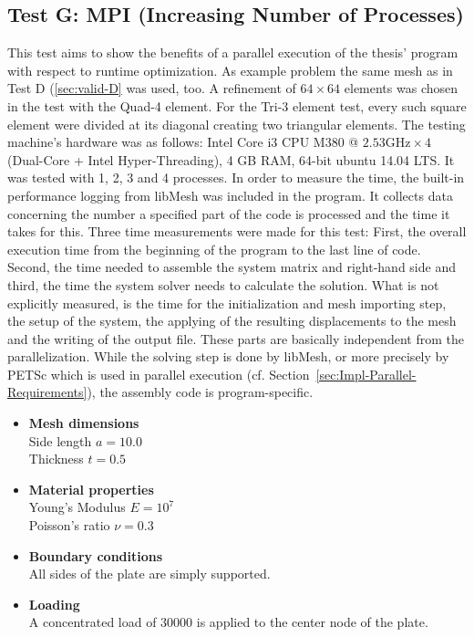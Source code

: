  \subsection{Test G: MPI (Increasing Number of Processes)}\label{sec:valid-G}
  This test aims to show the benefits of a parallel execution of the thesis' program with respect to runtime optimization. As example problem the same mesh as in Test D (\ref{sec:valid-D} was used, too. A refinement of $64\!\times\!64$ elements was chosen in the test with the Quad-4 element. For the Tri-3 element test, every such square element were divided at its diagonal creating two triangular elements. The testing machine's hardware was as follows: Intel Core i3 CPU M380 @ $2.53\text{GHz} \times 4$ (Dual-Core + Intel Hyper-Threading), 4 GB RAM, 64-bit ubuntu 14.04 LTS. It was tested with 1, 2, 3 and 4 processes. In order to measure the time, the built-in performance logging from libMesh was included in the program. It collects data concerning the number a specified part of the code is processed and the time it takes for this. Three time measurements were made for this test: First, the overall execution time from the beginning of the program to the last line of code. Second, the time needed to assemble the system matrix and right-hand side and third, the time the system solver needs to calculate the solution. What is not explicitly measured, is the time for the initialization and mesh importing step, the setup of the system, the applying of the resulting displacements to the mesh and the writing of the output file. These parts are basically independent from the parallelization. While the solving step is done by libMesh, or more precisely by PETSc which is used in parallel execution (cf. Section~\ref{sec:Impl-Parallel-Requirements}), the assembly code is program-specific.
  
  \begin{itemize}
   \item \textbf{Mesh dimensions}\\
   Side length $a = 10.0$\\
   Thickness $t = 0.5$
         	
   \item \textbf{Material properties}\\
   Young's Modulus $E = 10^7$\\
   Poisson's ratio $\nu = 0.3$
         	
   \item \textbf{Boundary conditions}\\
   All sides of the plate are simply supported.
        	
   \item \textbf{Loading}\\
   A concentrated load of $30000$ is applied to the center node of the plate.
  \end{itemize}
  
